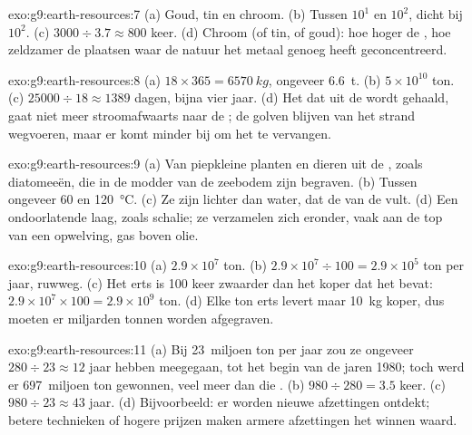 \begin{solution}{exo:g9:earth-resources:7}
(a) Goud, tin en chroom. (b) Tussen $10^1$ en $10^2$, dicht bij $10^2$.
(c) $3000 \div 3.7 \approx 800$ keer. (d) Chroom (of tin, of goud): hoe
hoger de , hoe zeldzamer de plaatsen waar de natuur het
metaal genoeg heeft geconcentreerd.
\end{solution}

\begin{solution}{exo:g9:earth-resources:8}
(a) $18 \times 365 = \qty{6570}{kg}$, ongeveer \qty{6.6}{t}. (b) $5 \times
10^{10}$ ton. (c) $25000 \div 18 \approx 1389$ dagen, bijna vier jaar.
(d) Het  dat uit de  wordt gehaald, gaat niet meer stroomafwaarts
naar de ; de golven blijven  van het strand wegvoeren, maar er komt
minder bij om het te vervangen.
\end{solution}

\begin{solution}{exo:g9:earth-resources:9}
(a) Van piepkleine planten en dieren uit de , zoals diatomeeën, die in
de modder van de zeebodem zijn begraven. (b) Tussen ongeveer 60 en
\qty{120}{\degreeCelsius}. (c) Ze zijn lichter dan water, dat de 
van de  vult. (d) Een ondoorlatende laag, zoals schalie; ze
verzamelen zich eronder, vaak aan de top van een opwelving, gas boven
olie.
\end{solution}

\begin{solution}{exo:g9:earth-resources:10}
(a) $2.9 \times 10^7$ ton. (b) $2.9 \times 10^7 \div 100 = 2.9 \times
10^5$ ton per jaar, ruwweg. (c) Het erts is 100 keer zwaarder dan het
koper dat het bevat: $2.9 \times 10^7 \times 100 = 2.9 \times 10^9$ ton.
(d) Elke ton erts levert maar \qty{10}{kg} koper, dus moeten er miljarden
tonnen  worden afgegraven.
\end{solution}

\begin{solution}{exo:g9:earth-resources:11}
(a) Bij 23~miljoen ton per jaar zou ze ongeveer $280 \div 23
\approx 12$ jaar hebben meegegaan, tot het begin van de jaren 1980; toch
werd er 697~miljoen ton gewonnen, veel meer dan die .
(b) $980 \div 280 = 3.5$ keer. (c) $980 \div
23 \approx 43$ jaar. (d) Bijvoorbeeld: er worden nieuwe afzettingen
ontdekt; betere technieken of hogere prijzen maken armere afzettingen het
winnen waard.
\end{solution}

